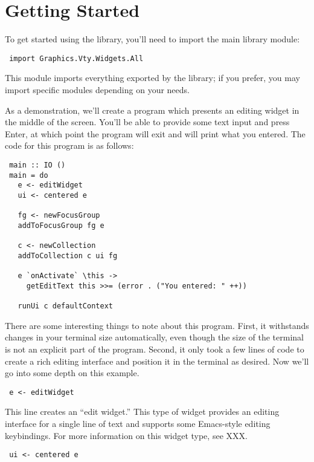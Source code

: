 \section{Getting Started}
\label{sec:gettingStarted}

To get started using the library, you'll need to import the main library
module:

\begin{verbatim}
 import Graphics.Vty.Widgets.All
\end{verbatim}

This module imports everything exported by the library; if you prefer,
you may import specific modules depending on your needs.

As a demonstration, we'll create a program which presents an editing
widget in the middle of the screen.  You'll be able to provide some
text input and press Enter, at which point the program will exit and
will print what you entered.  The code for this program is as follows:

\begin{verbatim}
 main :: IO ()
 main = do
   e <- editWidget
   ui <- centered e

   fg <- newFocusGroup
   addToFocusGroup fg e

   c <- newCollection
   addToCollection c ui fg

   e `onActivate` \this ->
     getEditText this >>= (error . ("You entered: " ++))

   runUi c defaultContext
\end{verbatim}

There are some interesting things to note about this program.  First,
it withstands changes in your terminal size automatically, even though
the size of the terminal is not an explicit part of the program.
Second, it only took a few lines of code to create a rich editing
interface and position it in the terminal as desired.  Now we'll go
into some depth on this example.

\begin{verbatim}
 e <- editWidget
\end{verbatim}

This line creates an “edit widget.”  This type of widget provides an
editing interface for a single line of text and supports some
Emacs-style editing keybindings.  For more information on this widget
type, see XXX.

\begin{verbatim}
 ui <- centered e
\end{verbatim}

